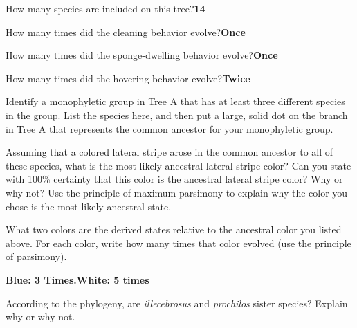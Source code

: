 \documentclass[11pt, addpoints]{exam}
\begin{document}
\begin{questions}

\question[1]
How many species are included on this tree?\ifprintanswers\quad\textbf{14}\fi


\question[1]
How many times did the cleaning behavior evolve?\ifprintanswers\quad\textbf{Once}\fi


\question[1]
How many times did the sponge-dwelling behavior evolve?\ifprintanswers\quad\textbf{Once}\fi


\question[1]
How many times did the hovering behavior evolve?\ifprintanswers\quad\textbf{Twice}\fi


\question[1]
Identify a monophyletic group in Tree A that has at least three
different species in the group. List the species here, and then put a
large, solid dot on the branch in Tree A that represents the common
ancestor for your monophyletic group.


\newpage

\question[1]
Assuming that a colored lateral stripe arose in the common ancestor
to all of these species, what is the most likely ancestral lateral
stripe color? Can you state with 100\% certainty that this color is the
ancestral lateral stripe color? Why or why not? Use the principle of
maximum parsimony to explain why the color you chose is the most likely
ancestral state.


\question[1]
What two colors are the derived states relative to the ancestral
color you listed above. For each color, write how many times that color
evolved (use the principle of parsimony).

\ifprintanswers\quad\textbf{Blue: 3 Times.}\quad\textbf{White: 5 times}\fi


\question[1]
According to the phylogeny, are \emph{illecebrosus} and
\emph{prochilos} sister species? Explain why or why not.


\end{questions}
\end{document}
